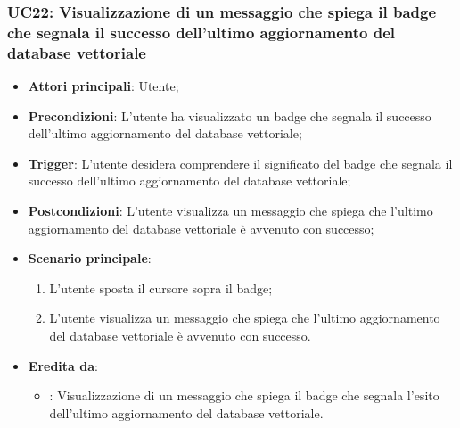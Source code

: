 \subsubsection{UC22: Visualizzazione di un messaggio che spiega il badge che segnala il successo dell'ultimo aggiornamento del database vettoriale}
\begin{itemize}
    \item \textbf{Attori principali}: Utente;
    \item \textbf{Precondizioni}: L'utente ha visualizzato un badge che segnala il successo dell'ultimo aggiornamento del database vettoriale;
    \item \textbf{Trigger}: L'utente desidera comprendere il significato del badge che segnala il successo dell'ultimo aggiornamento del database vettoriale;
    \item \textbf{Postcondizioni}: L'utente visualizza un messaggio che spiega che l'ultimo aggiornamento del database vettoriale è avvenuto con successo;
    \item \textbf{Scenario principale}:
    \begin{enumerate}
        \item L'utente sposta il cursore sopra il badge;
        \item L'utente visualizza un messaggio che spiega che l'ultimo aggiornamento del database vettoriale è avvenuto con successo.
    \end{enumerate}
    \item \textbf{Eredita da}:
    \begin{itemize}
        \item {}: Visualizzazione di un messaggio che spiega il badge che segnala l'esito dell'ultimo aggiornamento del database vettoriale.
    \end{itemize}
\end{itemize}

\hypertarget{UC23}{}
